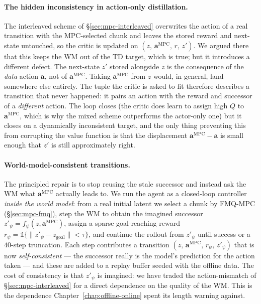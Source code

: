 \paragraph{The hidden inconsistency in action-only distillation.} The interleaved scheme of \S\ref{sec:mpc-interleaved} overwrites the action of a real transition with the MPC-selected chunk and leaves the stored reward and next-state untouched, so the critic is updated on $(z,\, \mathbf{a}^{\text{MPC}},\, r,\, z')$. We argued there that this keeps the WM out of the TD target, which is true; but it introduces a different defect. The next-state $z'$ stored alongside $z$ is the consequence of the \emph{data} action $\mathbf{a}$, not of $\mathbf{a}^{\text{MPC}}$. Taking $\mathbf{a}^{\text{MPC}}$ from $z$ would, in general, land somewhere else entirely. The tuple the critic is asked to fit therefore describes a transition that never happened: it pairs an action with the reward and successor of a \emph{different} action. The loop closes (the critic does learn to assign high $Q$ to $\mathbf{a}^{\text{MPC}}$, which is why the mixed scheme outperforms the actor-only one) but it closes on a dynamically inconsistent target, and the only thing preventing this from corrupting the value function is that the displacement $\mathbf{a}^{\text{MPC}} - \mathbf{a}$ is small enough that $z'$ is still approximately right.

\paragraph{World-model-consistent transitions.} The principled repair is to stop reusing the stale successor and instead ask the WM what $\mathbf{a}^{\text{MPC}}$ actually leads to. We run the agent as a closed-loop controller \emph{inside the world model}: from a real initial latent we select a chunk by FMQ-MPC (\S\ref{sec:mpc-fmq}), step the WM to obtain the imagined successor $z'_\psi = f_\psi(z, \mathbf{a}^{\text{MPC}})$, assign a sparse goal-reaching reward $r_\psi = \mathbb{1}\{\lVert z'_\psi - z_{\text{goal}}\rVert < \tau\}$, and continue the rollout from $z'_\psi$ until success or a $40$-step truncation. Each step contributes a transition $(z,\, \mathbf{a}^{\text{MPC}},\, r_\psi,\, z'_\psi)$ that is now \emph{self-consistent} --- the successor really is the model's prediction for the action taken --- and these are added to a replay buffer seeded with the offline data. The cost of consistency is that $z'_\psi$ is imagined: we have traded the action-mismatch of \S\ref{sec:mpc-interleaved} for a direct dependence on the quality of the WM. This is the dependence Chapter~\ref{chap:offline-online} spent its length warning against.

